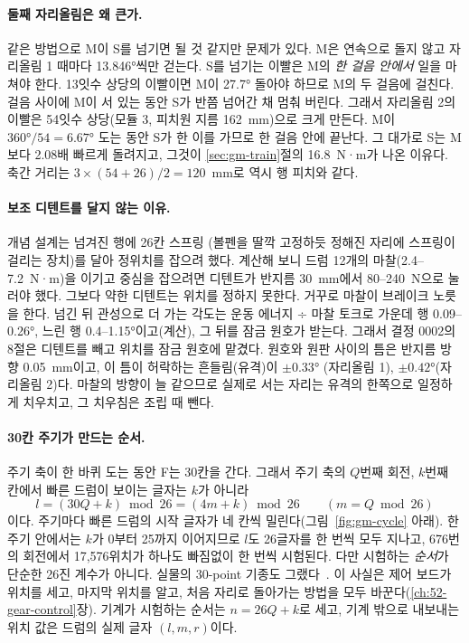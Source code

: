 \paragraph{둘째 자리올림은 왜 큰가.} 같은 방법으로 M이 S를 넘기면 될 것 같지만 문제가 있다. M은 연속으로 돌지 않고
자리올림 1 때마다 13.846°씩만 걷는다. S를 넘기는 이빨은 M의 \emph{한 걸음 안에서} 일을 마쳐야 한다. 13잇수 상당의
이빨이면 M이 27.7° 돌아야 하므로 M의 두 걸음에 걸친다. 걸음 사이에 M이 서 있는 동안 S가 반쯤 넘어간 채 멈춰
버린다. 그래서 자리올림 2의 이빨은 54잇수 상당(모듈 3, 피치원 지름 162~mm)으로 크게 만든다. M이 $360°/54 = 6.67°$
도는 동안 S가 한 이를 가므로 한 걸음 안에 끝난다. 그 대가로 S는 M보다 2.08배 빠르게 돌려지고, 그것이
\ref{sec:gm-train}절의 16.8~N·m가 나온 이유다. 축간 거리는 $3 \times (54 + 26)/2 = 120$~mm로 역시 행 피치와 같다.

\paragraph{보조 디텐트를 달지 않는 이유.} 개념 설계는 넘겨진 행에 26칸 스프링 (볼펜을 딸깍
고정하듯 정해진 자리에 스프링이 걸리는 장치)를 달아 정위치를 잡으려 했다. 계산해 보니 드럼 12개의 마찰(2.4--7.2~N·m)을
이기고 중심을 잡으려면 디텐트가 반지름 30~mm에서 80--240~N으로 눌러야 했다. 그보다 약한 디텐트는 위치를 정하지
못한다. 거꾸로 마찰이 브레이크 노릇을 한다. 넘긴 뒤 관성으로 더 가는 각도는 운동 에너지 ÷ 마찰 토크로 가운데 행
0.09--0.26°, 느린 행 0.4--1.15°이고(계산), 그 뒤를 잠금 원호가 받는다. 그래서 결정 0002의 8절은 디텐트를 빼고 위치를
잠금 원호에 맡겼다. 원호와 원판 사이의 틈은 반지름 방향 0.05~mm이고, 이 틈이 허락하는 흔들림(유격)이 $\pm0.33°$
(자리올림 1), $\pm0.42°$(자리올림 2)다. 마찰의 방향이 늘 같으므로 실제로 서는 자리는 유격의 한쪽으로 일정하게
치우치고, 그 치우침은 조립 때 뺀다.

\paragraph{30칸 주기가 만드는 순서.} 주기 축이 한 바퀴 도는 동안 F는 30칸을 간다. 그래서 주기 축의 $Q$번째 회전,
$k$번째 칸에서 빠른 드럼이 보이는 글자는 $k$가 아니라
\[
  l = (30Q + k) \bmod 26 = (4m + k) \bmod 26 \qquad (m = Q \bmod 26)
\]
이다. 주기마다 빠른 드럼의 시작 글자가 네 칸씩 밀린다(그림~\ref{fig:gm-cycle} 아래). 한 주기 안에서는 $k$가 0부터 25까지
이어지므로 $l$도 26글자를 한 번씩 모두 지나고, 676번의 회전에서 17,576위치가 하나도 빠짐없이 한 번씩 시험된다. 다만
시험하는 \emph{순서}가 단순한 26진 계수가 아니다. 실물의 30-point 기종도 그랬다~\cite{jackson-bh09}. 이 사실은 제어
보드가 위치를 세고, 마지막 위치를 알고, 처음 자리로 돌아가는 방법을 모두 바꾼다(\ref{ch:52-gear-control}장). 기계가
시험하는 순서는 $n = 26Q + k$로 세고, 기계 밖으로 내보내는 위치 값은 드럼의 실제 글자 $(l, m, r)$이다.

